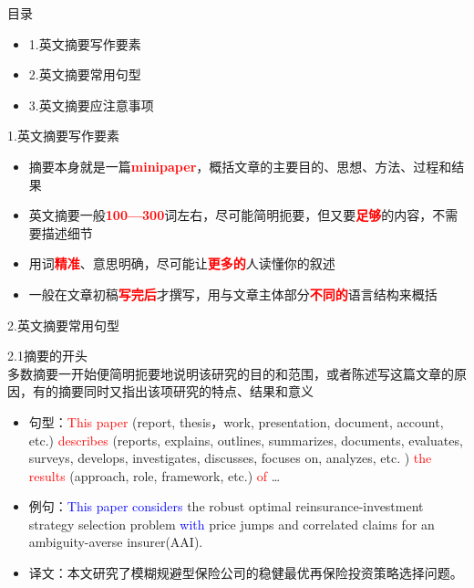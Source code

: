 \documentclass[13pt]{ctexbeamer}
\newcommand{\red}[1]{\textcolor{red}{#1}}
\newcommand{\blue}[1]{\textcolor{blue}{#1}}
\begin{document}
\begin{frame}{目录}
    \renewcommand{\baselinestretch}{2.0}

    \begin{itemize}

        \item 1.英文摘要写作要素
        \item 2.英文摘要常用句型
        \item 3.英文摘要应注意事项
    \end{itemize}
    \vspace{20pt}


\end{frame}
\begin{frame}{1.英文摘要写作要素}
    \setlength{\baselineskip}{23pt}
    \begin{itemize}

        \item 摘要本身就是一篇\red{\textbf{minipaper}}，概括文章的主要目的、思想、方法、过程和结果
        \item 英文摘要一般\red{\textbf{100—300}}词左右，尽可能简明扼要，但又要\red{\textbf{足够}}的内容，不需要描述细节
        \item 用词\red{\textbf{精准}}、意思明确，尽可能让\red{\textbf{更多的}}人读懂你的叙述
        \item 一般在文章初稿\red{\textbf{写完后}}才撰写，用与文章主体部分\red{\textbf{不同的}}语言结构来概括
    \end{itemize}
    \vspace{20pt}


\end{frame}

\begin{frame}{2.英文摘要常用句型}

    2.1摘要的开头
    \\
    \renewcommand{\baselinestretch}{1.3}
    多数摘要一开始便简明扼要地说明该研究的目的和范围，或者陈述写这篇文章的原因，有的摘要同时又指出该项研究的特点、结果和意义\\

    \begin{itemize}
        \item
        句型：\red{This paper} (report, thesis，work, presentation, document, account, etc.) \red{describes }(reports, explains, outlines, summarizes,
        documents, evaluates, surveys, develops, investigates, discusses,
        focuses on, analyzes, etc. )  \red{the results} (approach, role, framework,
        etc.) \red{of} …
        \item
        例句：\blue{This paper considers }the robust optimal reinsurance-investment strategy selection problem  \blue{with} price jumps and correlated claims for an ambiguity-averse insurer(AAI).

        \item
        译文：本文研究了模糊规避型保险公司的稳健最优再保险投资策略选择问题。

    \end{itemize}

    \vspace{15pt}

\end{frame}
\end{document}

